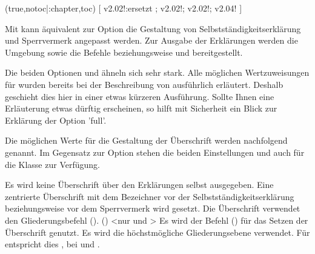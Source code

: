 \begin{DeclareEntity*}{}
\begin{DeclareEntity*}{}
\begin{DeclareEntity*}{}
\begin{Declaration}
  {}
  (true,notoc|:chapter,toc)
[%
  v2.02!:ersetzt ;%
  v2.02!;%
  v2.02!;%
  v2.04!%
]
\printdeclarationlist

Mit  kann äquivalent zur Option  die 
Gestaltung von Selbstständigkeitserklärung und Sperrvermerk angepasst werden.
Zur Ausgabe der Erklärungen werden die Umgebung  
sowie die Befehle  beziehungsweise  und 
 bereitgestellt. 

Die beiden Optionen  und  ähneln sich sehr 
stark. Alle möglichen Wertzuweisungen für  wurden bereits 
bei der Beschreibung von  ausführlich erläutert. Deshalb 
geschieht dies hier in einer etwas kürzeren Ausführung. Sollte Ihnen eine 
Erläuterung etwas dürftig erscheinen, so hilft mit Sicherheit ein Blick zur 
Erklärung der Option 'full'.

Die möglichen Werte für die Gestaltung der Überschrift werden nachfolgend 
genannt. Im Gegensatz zur Option  stehen die beiden 
Einstellungen  und  auch für 
die Klasse  zur Verfügung.
\begin{DeclareValues}
  Es wird keine Überschrift über den Erklärungen selbst ausgegeben.
  Eine zentrierte Überschrift mit dem Bezeichner  vor 
  der Selbstständigkeitserklärung beziehungsweise  vor dem 
  Sperrvermerk wird gesetzt. 
  Die Überschrift verwendet den Gliederungsbefehl 
  ().
()
    <nur  und >
  Es wird der Befehl () für das Setzen der 
  Überschrift genutzt. 
  Es wird die höchstmögliche Gliederungsebene verwendet. Für 
   entspricht dies , bei 
   und  .
\end{DeclareValues}


\end{Declaration}
\end{DeclareEntity*}
\end{DeclareEntity*}
\end{DeclareEntity*}

